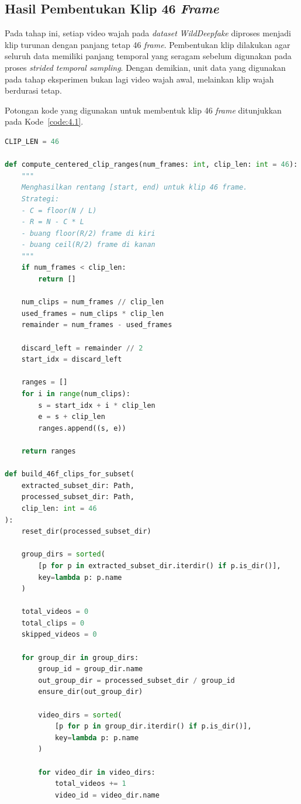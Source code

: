 \subsection{Hasil Pembentukan Klip 46 \textit{Frame}} \label{IV.Klip46}
Pada tahap ini, setiap video wajah pada \textit{dataset} \textit{WildDeepfake} diproses menjadi klip turunan dengan panjang tetap 46 \textit{frame}. Pembentukan klip dilakukan agar seluruh data memiliki panjang temporal yang seragam sebelum digunakan pada proses \textit{strided temporal sampling}. Dengan demikian, unit data yang digunakan pada tahap eksperimen bukan lagi video wajah awal, melainkan klip wajah berdurasi tetap.

Potongan kode yang digunakan untuk membentuk klip 46 \textit{frame} ditunjukkan pada Kode~\ref{code:4.1}.

\begin{lstlisting}[language=Python, caption={Pembentukan Klip 46 \textit{Frame}}, label={code:4.1}]
CLIP_LEN = 46

def compute_centered_clip_ranges(num_frames: int, clip_len: int = 46):
	"""
	Menghasilkan rentang [start, end) untuk klip 46 frame.
	Strategi:
	- C = floor(N / L)
	- R = N - C * L
	- buang floor(R/2) frame di kiri
	- buang ceil(R/2) frame di kanan
	"""
	if num_frames < clip_len:
		return []

	num_clips = num_frames // clip_len
	used_frames = num_clips * clip_len
	remainder = num_frames - used_frames

	discard_left = remainder // 2
	start_idx = discard_left

	ranges = []
	for i in range(num_clips):
		s = start_idx + i * clip_len
		e = s + clip_len
		ranges.append((s, e))

	return ranges

def build_46f_clips_for_subset(
	extracted_subset_dir: Path,
	processed_subset_dir: Path,
	clip_len: int = 46
):
	reset_dir(processed_subset_dir)

	group_dirs = sorted(
		[p for p in extracted_subset_dir.iterdir() if p.is_dir()],
		key=lambda p: p.name
	)

	total_videos = 0
	total_clips = 0
	skipped_videos = 0

	for group_dir in group_dirs:
		group_id = group_dir.name
		out_group_dir = processed_subset_dir / group_id
		ensure_dir(out_group_dir)

		video_dirs = sorted(
			[p for p in group_dir.iterdir() if p.is_dir()],
			key=lambda p: p.name
		)

		for video_dir in video_dirs:
			total_videos += 1
			video_id = video_dir.name


\end{lstlisting}
